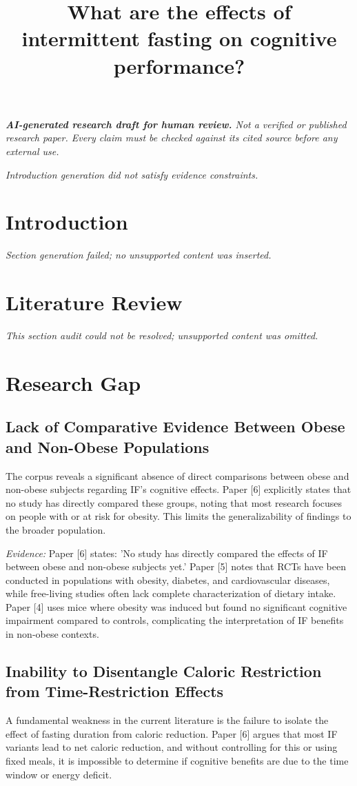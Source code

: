 \documentclass[11pt]{article}
\title{What are the effects of intermittent fasting on cognitive performance?}
\date{}
\begin{document}
\maketitle
\textit{\textbf{AI-generated research draft for human review.} Not a verified or published research paper. Every claim must be checked against its cited source before any external use.}\par

\textit{Introduction generation did not satisfy evidence constraints.}

\section{Introduction}
\textit{Section generation failed; no unsupported content was inserted.}

\section{Literature Review}
\textit{This section audit could not be resolved; unsupported content was omitted.}

\section{Research Gap}
\subsection{Lack of Comparative Evidence Between Obese and Non-Obese Populations}
The corpus reveals a significant absence of direct comparisons between obese and non-obese subjects regarding IF's cognitive effects. Paper [6] explicitly states that no study has directly compared these groups, noting that most research focuses on people with or at risk for obesity. This limits the generalizability of findings to the broader population.

\textit{Evidence:} Paper [6] states: 'No study has directly compared the effects of IF between obese and non-obese subjects yet.' Paper [5] notes that RCTs have been conducted in populations with obesity, diabetes, and cardiovascular diseases, while free-living studies often lack complete characterization of dietary intake. Paper [4] uses mice where obesity was induced but found no significant cognitive impairment compared to controls, complicating the interpretation of IF benefits in non-obese contexts.

\subsection{Inability to Disentangle Caloric Restriction from Time-Restriction Effects}
A fundamental weakness in the current literature is the failure to isolate the effect of fasting duration from caloric reduction. Paper [6] argues that most IF variants lead to net caloric reduction, and without controlling for this or using fixed meals, it is impossible to determine if cognitive benefits are due to the time window or energy deficit.
\end{document}
